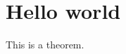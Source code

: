 \documentclass[reqno]{amsart} 
\begin{document}
\section{Hello world}


\begin{theorem}\label{theorem:d1bd91cb750b}
This is a theorem.
\end{theorem}

{} 
\end{document}
